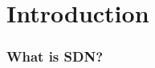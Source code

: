 \documentclass[11pt]{beamer}
\begin{document}



% 



 


% 	
% 			


\section{Introduction}
\begin{frame}
\frametitle{What is SDN?}
\end{frame}

\end{document}
